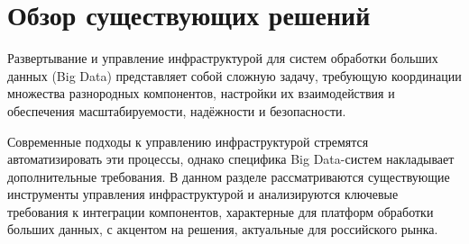 \chapter{Обзор существующих решений} \label{ch1}
Развертывание и управление инфраструктурой для систем обработки больших данных (Big Data) представляет собой сложную задачу, требующую координации множества разнородных компонентов, настройки их взаимодействия и обеспечения масштабируемости, надёжности и безопасности.

Современные подходы к управлению инфраструктурой стремятся автоматизировать эти процессы, однако специфика Big Data-систем накладывает дополнительные требования. В данном разделе рассматриваются существующие инструменты управления инфраструктурой и анализируются ключевые требования к интеграции компонентов, характерные для платформ обработки больших данных, с акцентом на решения, актуальные для российского рынка.

